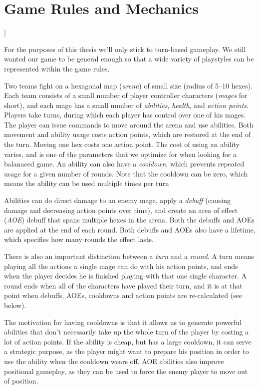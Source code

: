 \chapter{Game Rules and Mechanics}
\label{chapter02}|

For the purposes of this thesis we'll only stick to turn-based gameplay. We
still wanted our game to be general enough so that a wide variety of
playstyles can be represented within the game rules.

Two teams fight on a hexagonal map (\emph{arena}) of small size (radius of
5--10 hexes). Each team consists of a small number of player controller
characters (\emph{mages} for short), and each mage has a small number of
\emph{abilities}, \emph{health}, and \emph{action points}. Players take turns, during
which each player has control over one of his mages. The player can issue
commands to move around the arena and use abilities. Both movement and ability
usage costs action points, which are restored at the end of the turn.  Moving
one hex costs one action point. The cost of using an ability varies, and is one
of the parameters that we optimize for when looking for a balanaced game. An
ability can also have a \emph{cooldown}, which prevents repeated usage for a
given number of rounds. Note that the cooldown can be zero, which means the
ability can be used multiple times per turn

Abilities can do direct damage to an enemy mage, apply a \emph{debuff} (causing
damage and decreasing action points over time), and create an area of effect
(\emph{AOE}) debuff that spans multiple hexes in the arena. Both the debuffs and
AOEs are applied at the end of each round. Both debuffs and AOEs also have a lifetime,
which specifies how many rounds the effect lasts.

There is also an important distinction between a \emph{turn} and a \emph{round}.
A turn means playing all the actions a single mage can do with his action points,
and ends when the player decides he is finished playing with that one single character.
A round ends when all of the characters have played their turn, and it is at that point
when debuffs, AOEs, cooldowns and action points are re-calculated (see below).

The motivation for having cooldowns is that it allows us to generate powerful
abilities that don't necessarily take up the whole turn of the player by costing
a lot of action points. If the ability is cheap, but has a large cooldown, it can
serve a strategic purpose, as the player might want to prepare his position in order
to use the ability when the cooldown wears off. AOE abilities also improve positional
gameplay, as they can be used to force the enemy player to move out of position.

